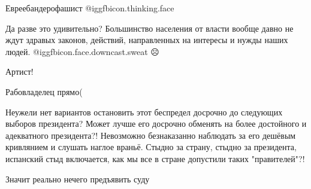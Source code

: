\begin{itemize}
Евреебандерофашист  @igg{fbicon.thinking.face} 


Да разве это удивительно? Большинство населения от власти вообще давно не ждут
здравых законов, действий, направленных на интересы и нужды наших людей. @igg{fbicon.face.downcast.sweat} ☹

Артист!

Рабовладелец прямо(


Неужели нет вариантов остановить этот беспредел досрочно до следующих выборов
президента? Может лучше его досрочно обменять на более достойного и адекватного
президента?! Невозможно безнаказанно наблюдать за его дешёвым кривлянием и
слушать наглое враньё. Стыдно за страну, стыдно за президента, испанский стыд
включается, как мы все в стране допустили таких "правителей"?!

Значит реально нечего предъявить суду

\end{itemize} %
